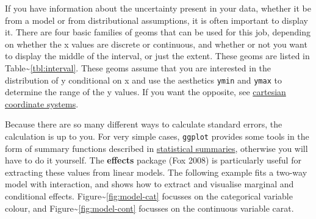 If you have information about the uncertainty present in your data,
whether it be from a model or from distributional assumptions, it is
often important to display it. There are four basic families of geoms
that can be used for this job, depending on whether the x values are
discrete or continuous, and whether or not you want to display the
middle of the interval, or just the extent. These geoms are listed in
Table\textasciitilde{}\ref{tbl:interval}. These geoms assume that you
are interested in the distribution of y conditional on x and use the
aesthetics \texttt{ymin} and \texttt{ymax} to determine the range of the
y values. If you want the opposite, see
\hyperref[sub:cartesian]{cartesian coordinate systems}.
  
  
  

Because there are so many different ways to calculate standard errors,
the calculation is up to you.  For very simple
cases, \texttt{ggplot} provides some tools in the form of summary
functions described in \hyperref[sec:summary]{statistical summaries},
otherwise you will have to do it yourself. The \textbf{effects} package
(Fox 2008) is particularly useful for extracting these values from
linear models. The following example fits a two-way model with
interaction, and shows how to extract and visualise marginal and
conditional effects. Figure\textasciitilde{}\ref{fig:model-cat} focusses
on the categorical variable colour, and
Figure\textasciitilde{}\ref{fig:model-cont} focusses on the continuous
variable carat. 

